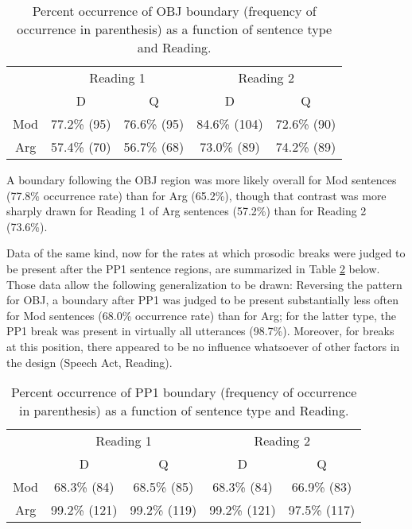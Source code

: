 \documentclass[11pt,oneside]{book}
\begin{document}
\begin{table}[!h]

\caption{\label{tab:obj}Percent occurrence of OBJ boundary (frequency of occurrence in parenthesis) as a function of sentence type and Reading.}
\centering
\begin{tabular}{ccccc}
\toprule
\multicolumn{1}{c}{ } & \multicolumn{2}{c}{Reading 1} & \multicolumn{2}{c}{Reading 2} \\
\cmidrule(l{3pt}r{3pt}){2-3} \cmidrule(l{3pt}r{3pt}){4-5}
 & D & Q & D & Q\\
\midrule
Mod & 77.2\% (95) & 76.6\% (95) & 84.6\% (104) & 72.6\% (90)\\
Arg & 57.4\% (70) & 56.7\% (68) & 73.0\% (89) & 74.2\% (89)\\
\bottomrule
\end{tabular}
\end{table}

A boundary following the OBJ region was more likely overall for Mod sentences (77.8\% occurrence rate) than for Arg (65.2\%), though that contrast was more sharply drawn for Reading 1 of Arg sentences (57.2\%) than for Reading 2 (73.6\%).

Data of the same kind, now for the rates at which prosodic breaks were judged to be present after the PP1 sentence regions, are summarized in Table \ref{tab:pp1} below. Those data allow the following generalization to be drawn: Reversing the pattern for OBJ, a boundary after PP1 was judged to be present substantially less often for Mod sentences (68.0\% occurrence rate) than for Arg; for the latter type, the PP1 break was present in virtually all utterances (98.7\%). Moreover, for breaks at this position, there appeared to be no influence whatsoever of other factors in the design (Speech Act, Reading).

\begin{table}[!h]

\caption{\label{tab:pp1}Percent occurrence of PP1 boundary (frequency of occurrence in parenthesis) as a function of sentence type and Reading.}
\centering
\begin{tabular}{ccccc}
\toprule
\multicolumn{1}{c}{ } & \multicolumn{2}{c}{Reading 1} & \multicolumn{2}{c}{Reading 2} \\
\cmidrule(l{3pt}r{3pt}){2-3} \cmidrule(l{3pt}r{3pt}){4-5}
 & D & Q & D & Q\\
\midrule
Mod & 68.3\% (84) & 68.5\% (85) & 68.3\% (84) & 66.9\% (83)\\
Arg & 99.2\% (121) & 99.2\% (119) & 99.2\% (121) & 97.5\% (117)\\
\bottomrule
\end{tabular}
\end{table}
\end{document}
